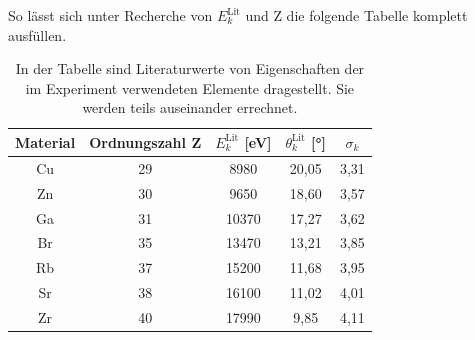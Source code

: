 \documentclass[titlepage = firstcover]{scrartcl}
\begin{document}
        \noindent
        So lässt sich unter Recherche von $E_k^{\text{Lit}}$ und Z die folgende Tabelle komplett ausfüllen.
        \FloatBarrier
        \begin{table}[h]
          \centering
          \caption{In der Tabelle sind Literaturwerte von Eigenschaften der im Experiment verwendeten Elemente dragestellt. Sie werden teils auseinander errechnet.}
          \label{tab:Elemente}
        
          \begin{tabular}{c c c c c}
            \toprule
            {Material}  & {Ordnungszahl Z} & {$E_k^{\text{Lit}}$ [eV]} & {$\theta_k^{\text{Lit}}$ [°]} & {$\sigma_k$} \\ 
            \midrule
            Cu	                &   29           &  8980          &  20,05     &    3,31   \\
            Zn	                &   30           &  9650          &  18,60     &    3,57   \\
            Ga	                &   31           &  10370         &  17,27     &    3,62   \\
            Br	                &   35           &  13470         &  13,21     &    3,85   \\
            Rb	                &   37           &  15200         &  11,68     &    3,95   \\
            Sr	                &   38           &  16100         &  11,02     &    4,01   \\
            Zr	                &   40           &  17990         &  9,85      &    4,11   \\
            \bottomrule
          \end{tabular}
        \end{table}
  
        \FloatBarrier
        
\end{document}
